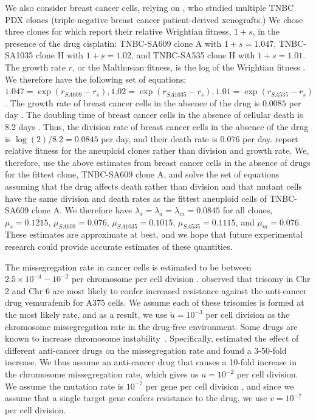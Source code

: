 \documentclass[12pt]{extarticle}
\renewcommand{\Delta}{r}
\begin{document}
We also consider breast cancer cells, relying on \citet{salehi2021clonal}, who studied multiple TNBC PDX clones (triple-negative breast cancer patient-derived xenografts.)
We chose three clones for which \cite{salehi2021clonal} report their relative Wrightian fitness, $1+s$, in the presence of the drug cisplatin: TNBC-SA609 clone A with $1+s=1.047$, TNBC-SA1035 clone H with $1+s=1.02$, and TNBC-SA535 clone H with $1+s=1.01$.
The growth rate $\Delta$, or the Malthusian fitness, is the log of the Wrightian fitness \citep{Wu2013a}. 
We therefore have the following set of equations: $1.047 = \exp{(\Delta_{SA609}-\Delta_s)}, 1.02=\exp{(\Delta_{SA1035}-\Delta_s)}, 1.01=\exp{(\Delta_{SA535}-\Delta_s)}$.
The growth rate of breast cancer cells in the absence of the drug is $0.0085$ per day \citep{spratt1996rates}.
The doubling time of breast cancer cells in the absence of cellular death is 8.2 days \citep{rew2000cell}.
Thus, the division rate of breast cancer cells in the absence of the drug is $\log{(2)}/8.2=0.0845$ per day, and their death rate is $0.076$ per day.
\cite{salehi2021clonal} report relative fitness for the aneuploid clones rather than division and growth rate. We, therefore, use the above estimates from breast cancer cells in the absence of drugs for the fittest clone, TNBC-SA609 clone A, and solve the set of equations assuming that the drug affects death rather than division and that mutant cells have the same division and death rates as the fittest aneuploid cells of TNBC-SA609 clone A.
We therefore have $\lambda_s=\lambda_a=\lambda_m=0.0845$ for all clones, $\mu_s=0.1215$, $\mu_{SA609} = 0.076$, $\mu_{SA1035}=0.1015$, $\mu_{SA535}=0.1115$, and $\mu_m=0.076$. 
These estimates are approximate at best, and we hope that future experimental research could provide accurate estimates of these quantities.

The missegregation rate in cancer cells is estimated to be between $2.5\times10^{-4}-10^{-2}$ per chromosome per cell division \citep{shi2005chromosome,thompson2008examining}. \citet{ippolito2021gene} observed that trisomy in Chr 2 and Chr 6 are most likely to confer increased resistance against the anti-cancer drug vemurafenib for A375 cells. We assume each of these trisomies is formed at the most likely rate, and as a result, we use $\tilde{u}=10^{-3}$ per cell division as the chromosome missegregation rate in the drug-free environment. 
Some drugs are known to increase chromosome instability~\citep{wang2019molecular,mason2017functional}. 
Specifically, \citet{lee2016effects} estimated the effect of different anti-cancer drugs on the missegregation rate and found a 3-50-fold increase.
We thus assume an anti-cancer drug that causes a 10-fold increase in the chromosome missegregation rate, which gives us $u=10^{-2}$ per cell division. We assume the mutation rate is $10^{-7}$ per gene per cell division \citep{loeb2001mutator}, and since we assume that a single target gene confers resistance to the drug, we use $v=10^{-7}$ per cell division. 
\end{document}
